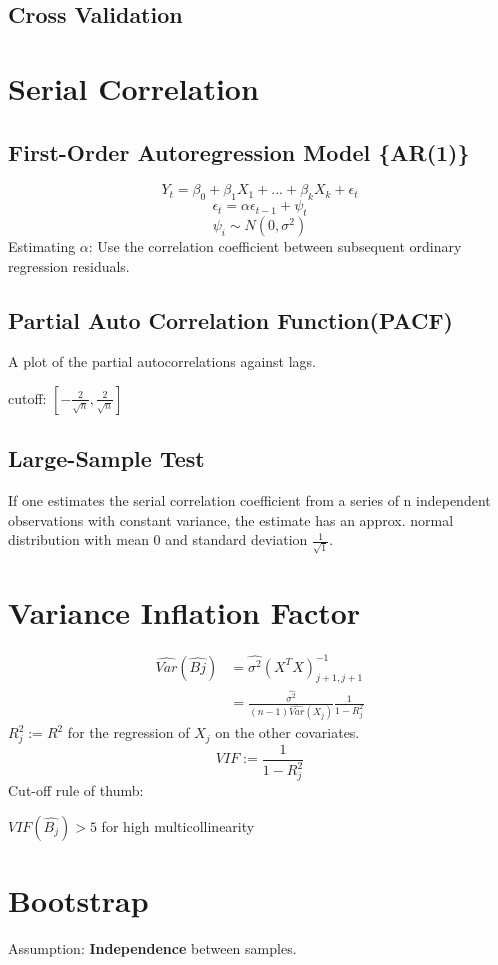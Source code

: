 \documentclass[10pt,landscape, fleqn]{article}
\begin{document}
\begin{multicols}{3}
			\subsection{Cross Validation}
			
		\section{Serial Correlation}
			\subsection{First-Order Autoregression Model \{AR(1)\}}
				\[ Y_t = \beta_0 + \beta_1X_1 + ... + \beta_kX_k + \epsilon_t\]
				\[ \epsilon_t  = \alpha\epsilon_{t-1} + \psi_t \]
				\[ \psi_i \sim N(0, \sigma^2) \]
				Estimating $\alpha$: Use the correlation coefficient between subsequent ordinary regression residuals.
			\subsection{Partial Auto Correlation Function(PACF)}
				A plot of the partial autocorrelations against lags. \par 
				cutoff: $ [-\frac{2}{\sqrt{n}}, \frac{2}{\sqrt{n}}]$
			\subsection{Large-Sample Test}
				If one estimates the serial correlation coefficient from a series of n independent observations with constant variance, the estimate has an approx. normal distribution with mean 0 and standard deviation $\frac{1}{\sqrt{1}}$.
				
		\section{Variance Inflation Factor}
			\[ 
			\begin{split}
				\widehat{Var}(\hat{Bj}) &= \hat{\sigma^2}(X^TX)^{-1}_{j+1, j+1} \\
				    &= \frac{\hat{\sigma^2}}{(n-1)\widehat{Var}(X_j)}\frac{1}{1-R^2_j}
			\end{split}
			\]
			$R^2_j := R^2$ for the regression of $X_j$ on the other covariates.
			\[ VIF := \frac{1}{1-R^2_j} \]
			Cut-off rule of thumb: \par 
			$VIF(\hat{B_j}) > 5$ for high multicollinearity \par
			
		\section{Bootstrap}
			Assumption: 
			\textbf{Independence} between samples.

\end{multicols}
\end{document}
